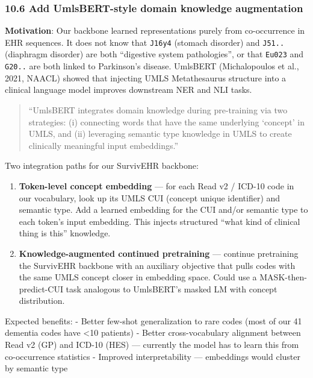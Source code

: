 \documentclass[
  11pt,
]{article}
\newcommand{\passthrough}[1]{#1}
\providecommand{\tightlist}{%
  \setlength{\itemsep}{0pt}\setlength{\parskip}{0pt}}
\begin{document}
\subsubsection{10.6 Add UmlsBERT-style domain knowledge
augmentation}\label{add-umlsbert-style-domain-knowledge-augmentation}

\textbf{Motivation}: Our backbone learned representations purely from
co-occurrence in EHR sequences. It does not know that
\passthrough{\lstinline!J16y4!} (stomach disorder) and
\passthrough{\lstinline!J51..!} (diaphragm disorder) are both
``digestive system pathologies'', or that
\passthrough{\lstinline!Eu023!} and \passthrough{\lstinline!G20..!} are
both linked to Parkinson's disease. UmlsBERT (Michalopoulos et al.,
2021, NAACL) showed that injecting UMLS Metathesaurus structure into a
clinical language model improves downstream NER and NLI tasks.

\begin{quote}
``UmlsBERT integrates domain knowledge during pre-training via two
strategies: (i) connecting words that have the same underlying `concept'
in UMLS, and (ii) leveraging semantic type knowledge in UMLS to create
clinically meaningful input embeddings.''
\end{quote}

Two integration paths for our SurvivEHR backbone:

\begin{enumerate}
\def\labelenumi{\arabic{enumi}.}
\tightlist
\item
  \textbf{Token-level concept embedding} --- for each Read v2 / ICD-10
  code in our vocabulary, look up its UMLS CUI (concept unique
  identifier) and semantic type. Add a learned embedding for the CUI
  and/or semantic type to each token's input embedding. This injects
  structured ``what kind of clinical thing is this'' knowledge.
\item
  \textbf{Knowledge-augmented continued pretraining} --- continue
  pretraining the SurvivEHR backbone with an auxiliary objective that
  pulls codes with the same UMLS concept closer in embedding space.
  Could use a MASK-then-predict-CUI task analogous to UmlsBERT's masked
  LM with concept distribution.
\end{enumerate}

Expected benefits: - Better few-shot generalization to rare codes (most
of our 41 dementia codes have \textless10 patients) - Better
cross-vocabulary alignment between Read v2 (GP) and ICD-10 (HES) ---
currently the model has to learn this from co-occurrence statistics -
Improved interpretability --- embeddings would cluster by semantic type
\end{document}
